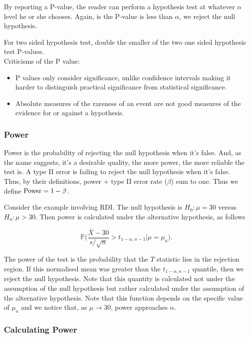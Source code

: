 \documentclass{homework}
\begin{document}
By reporting a P-value, the reader can perform a hypothesis test at whatever $\alpha$ level he or she chooses. Again, is the P-value is less than $\alpha$, we reject the null hypothesis.

For two sided hypothesis test, double the smaller of the two one sided hypothesis test P-values. \\ 

Criticisms of the P value:

\begin{itemize}
    \item P values only consider significance, unlike confidence intervals making it harder to distinguish practical significance from statistical significance.
    \item Absolute measures of the rareness of an event are not good measures of the evidence for or against a hypothesis.
\end{itemize}

\subsubsection{Power}

Power is the probability of rejecting the null hypothesis when it's false. And, as the name suggests, it's a desirable quality, the more power, the more reliable the test is. A type II error is failing to reject the null hypothesis when it's false. Thus, by their definitions, power + type II error rate ($\beta$) sum to one. Thus we define $\textnormal{Power} = 1- \beta$.

Consider the example involving RDI. The null hypothesis is $H_0 : \mu = 30$ versus $H_a : \mu > 30$. Then power is calculated under the alternative hypothesis, as follows  

$$
\mathds{P}\bigg(\frac{\bar{X}-30}{s/\sqrt{n}} > t_{1-\alpha, n-1} \bigg | \mu = \mu_a\bigg).
$$

The power of the test is the probability that the $T$ statistic lies in the rejection region. If this normalised mean was greater than the $t_{1-\alpha, n-1}$ quantile, then we reject the null hypothesis. Note that this quantity is calculated not under the assumption of the null hypothesis but rather calculated under the assumption of the alternative hypothesis. Note that this function depends on the specific value of $\mu_a$ and we notice that, as $\mu \rightarrow 30$, power approaches $\alpha$. \\

\subsubsection{Calculating Power}
\end{document}
